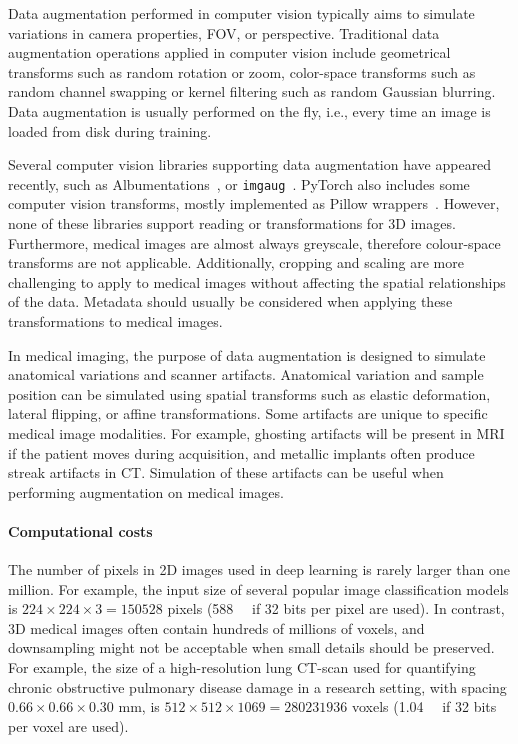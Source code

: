 Data augmentation performed in computer vision typically aims to simulate variations in camera properties, \ac{FOV}, or perspective.
Traditional data augmentation operations applied in computer vision include geometrical transforms such as random rotation or zoom, color-space transforms such as random channel swapping or kernel filtering such as random Gaussian blurring.
Data augmentation is usually performed on the fly, i.e., every time an image is loaded from disk during training.

Several computer vision libraries supporting data augmentation have appeared recently, such as Albumentations~\cite{buslaev_albumentations_2020}, or \texttt{imgaug}~\cite{jung_imgaug_2020}.
PyTorch also includes some computer vision transforms, mostly implemented as Pillow wrappers~\cite{wiredfool_pillow_2016}.
However, none of these libraries support reading or transformations for 3D images.
Furthermore, medical images are almost always greyscale, therefore colour-space transforms are not applicable.
Additionally, cropping and scaling are more challenging to apply to medical images without affecting the spatial relationships of the data.
Metadata should usually be considered when applying these transformations to medical images.

In medical imaging, the purpose of data augmentation is designed to simulate anatomical variations and scanner artifacts.
Anatomical variation and sample position can be simulated using spatial transforms such as elastic deformation, lateral flipping, or affine transformations.
Some artifacts are unique to specific medical image modalities.
For example, ghosting artifacts will be present in \ac{MRI} if the patient moves during acquisition, and metallic implants often produce streak artifacts in \ac{CT}.
Simulation of these artifacts can be useful when performing augmentation on medical images.


\paragraph{Computational costs}
\label{sec:computation}
The number of pixels in 2D images used in deep learning is rarely larger than one million.
For example, the input size of several popular image classification models is $224 \times 224 \times 3 = \num{150528}$ pixels (\SI{588}{\kibi\byte} if 32 bits per pixel are used).
In contrast, 3D medical images often contain hundreds of millions of voxels, and downsampling might not be acceptable when small details should be preserved.
For example, the size of a high-resolution lung \ac{CT}-scan used for quantifying chronic obstructive pulmonary disease damage in a research setting, with spacing $0.66 \times 0.66 \times 0.30$ mm, is $512 \times 512 \times 1069 = \num{280231936}$ voxels (\SI{1.04}{\gibi\byte} if 32 bits per voxel are used).


